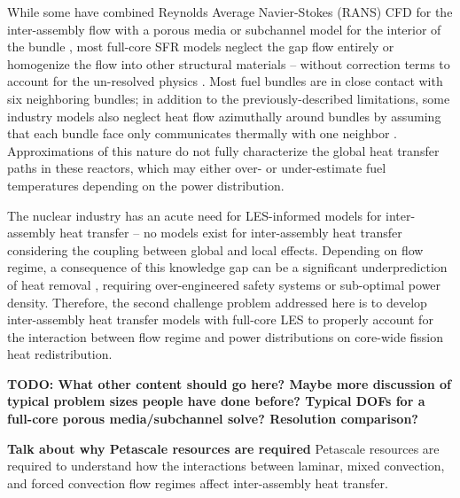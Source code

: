 While some have combined Reynolds Average Navier-Stokes (RANS) CFD for the inter-assembly flow with a porous media or subchannel model for the interior of the bundle \cite{wang2020,gerschenfeld}, most full-core SFR models neglect the gap flow entirely \cite{touran} or homogenize the flow into other structural materials \cite{fiorina_of} -- without correction terms to account for the un-resolved physics \cite{touran,fiorina_of}. Most fuel bundles are in close contact with six neighboring bundles; in addition to the previously-described limitations, some industry models also neglect heat flow azimuthally around bundles by assuming that each bundle face only communicates thermally with one neighbor \cite{touran}. Approximations of this nature do not fully characterize the global heat transfer paths in these reactors, which may either over- or under-estimate fuel temperatures depending on the power distribution.

The nuclear industry has an acute need for LES-informed models for inter-assembly heat transfer -- no models exist for inter-assembly heat transfer considering the coupling between global and local effects. Depending on flow regime, a consequence of this knowledge gap can be a significant underprediction of heat removal \cite{gerschenfeld}, requiring over-engineered safety systems or sub-optimal power density. Therefore, the second challenge problem addressed here is to develop inter-assembly heat transfer models with full-core LES to properly account for the interaction between flow regime and power distributions on core-wide fission heat redistribution. 


{\bf TODO: What other content should go here? Maybe more discussion of typical problem sizes people have done before? Typical DOFs for a full-core porous media/subchannel solve? Resolution comparison?}

{\bf Talk about why Petascale resources are required}
Petascale resources are required to understand how the interactions between laminar, mixed convection, and forced convection flow regimes affect inter-assembly heat transfer.




